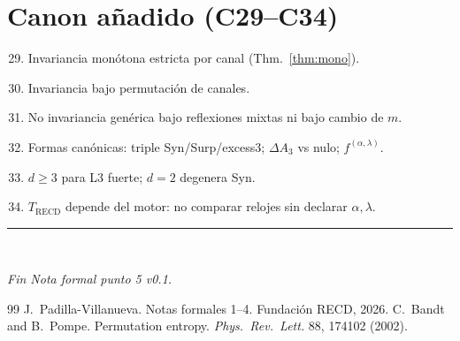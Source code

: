 \documentclass[11pt,a4paper]{article}
\theoremstyle{definition}
\theoremstyle{plain}
\theoremstyle{remark}
\newcommand{\RECD}{\mathrm{RECD}}
\begin{document}
\section{Canon a\~nadido (C29--C34)}
\label{sec:canon}

\begin{enumerate}[label=\textbf{C\arabic*.}]
  \setcounter{enumi}{28}
  \item Invariancia mon\'otona estricta por canal (Thm.~\ref{thm:mono}).
  \item Invariancia bajo permutaci\'on de canales.
  \item No invariancia gen\'erica bajo reflexiones mixtas ni bajo cambio
  de $m$.
  \item Formas can\'onicas: triple Syn/Surp/excess3; $\Delta A_3$ vs nulo;
  $f^{(\alpha,\lambda)}$.
  \item $d\ge 3$ para L3 fuerte; $d=2$ degenera Syn.
  \item $T_{\RECD}$ depende del motor: no comparar relojes sin declarar
  $\alpha,\lambda$.
\end{enumerate}

\vspace{1.5em}
\noindent\rule{\textwidth}{0.4pt}\\[0.5em]
\begin{center}
\em Fin Nota formal punto 5 v0.1.
\end{center}

\begin{thebibliography}{99}
J.~Padilla-Villanueva. Notas formales 1--4. Fundaci\'on RECD, 2026.
C.~Bandt and B.~Pompe. Permutation entropy.
\emph{Phys.\ Rev.\ Lett.} 88, 174102 (2002).
\end{thebibliography}
\end{document}
